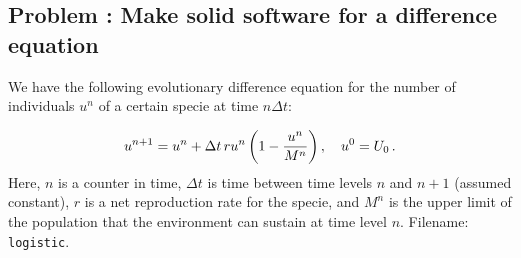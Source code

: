 \documentclass[%
oneside,                 %
final,                   %
10pt]{article}
\newenvironment{doconceexercise}{}{}
\newcounter{doconceexercisecounter}
\begin{document}
\begin{doconceexercise}

\subsection*{Problem \thedoconceexercisecounter: Make solid software for a difference equation}

\label{softeng1:exer:logistic}

We have the following evolutionary difference equation for the number
of individuals $u^n$ of a certain specie at time $n\Delta t$:

\begin{equation}
u^{n+1} = u^n + \Delta t\, r u^n\left(1 - \frac{u^n}{M^n}\right),
\quad u^0=U_0\tp
\label{softeng1:exer:logistic:eq}
\end{equation}
Here, $n$ is a counter in time, $\Delta t$ is time between time levels
$n$ and $n+1$ (assumed constant), $r$ is a net reproduction rate
for the specie,
and $M^n$ is the upper limit of the population that the environment can
sustain at time level $n$.
\noindent Filename: \texttt{logistic}.

\end{doconceexercise}








\cleardoublepage{}  %
\printindex
\end{document}

